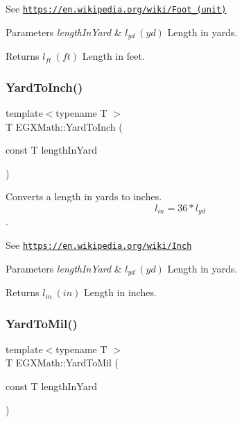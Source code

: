 See \href{https://en.wikipedia.org/wiki/Foot_(unit)}{\tt https\+://en.\+wikipedia.\+org/wiki/\+Foot\+\_\+(unit)} 
\begin{DoxyParams}{Parameters}
{\em length\+In\+Yard} & $ l_{yd}\ (yd)$ Length in yards. \\
\hline
\end{DoxyParams}
\begin{DoxyReturn}{Returns}
$ l_{ft}\ (ft)$ Length in feet. 
\end{DoxyReturn}
\mbox{\label{group___e_g_x_math-_conversions-_length_conversions-_imperial-_yard-_imperial_ga081865589d8e67f705080fcc6a7dabe3}} 
\subsubsection{\texorpdfstring{Yard\+To\+Inch()}{YardToInch()}}
{\footnotesize\ttfamily template$<$typename T $>$ \\
T E\+G\+X\+Math\+::\+Yard\+To\+Inch (\begin{DoxyParamCaption}\item[{const T}]{length\+In\+Yard }\end{DoxyParamCaption})}



Converts a length in yards to inches. \[ l_{in}= 36 * l_{yd} \]. 

See \href{https://en.wikipedia.org/wiki/Inch}{\tt https\+://en.\+wikipedia.\+org/wiki/\+Inch} 
\begin{DoxyParams}{Parameters}
{\em length\+In\+Yard} & $ l_{yd}\ (yd)$ Length in yards. \\
\hline
\end{DoxyParams}
\begin{DoxyReturn}{Returns}
$ l_{in}\ (in)$ Length in inches. 
\end{DoxyReturn}
\mbox{\label{group___e_g_x_math-_conversions-_length_conversions-_imperial-_yard-_imperial_ga9ff8041d33178b44c133dbbd37a8b267}} 
\subsubsection{\texorpdfstring{Yard\+To\+Mil()}{YardToMil()}}
{\footnotesize\ttfamily template$<$typename T $>$ \\
T E\+G\+X\+Math\+::\+Yard\+To\+Mil (\begin{DoxyParamCaption}\item[{const T}]{length\+In\+Yard }\end{DoxyParamCaption})}



